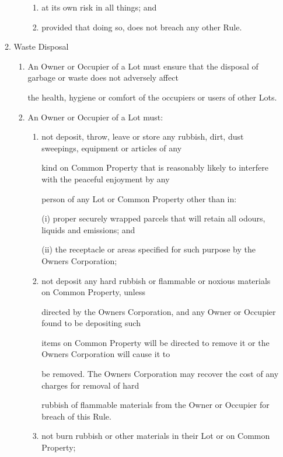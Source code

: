 \documentclass{article}
\begin{document}
\begin{enumerate}[label=\arabic*.]
\begin{enumerate}[label=\arabic{enumi}.\arabic*.]
\begin{enumerate}[label=(\arabic*)]
\begin{enumerate}[label=(\alph*)]
\item  at its own risk in all things; and 

\item  provided that doing so, does not breach any other Rule. 

\end{enumerate}
\end{enumerate}
\item  Waste Disposal 

\begin{enumerate}[label=(\arabic*)]
\item  An Owner or Occupier of a Lot must ensure that the disposal of garbage or waste does not adversely affect 

the health, hygiene or comfort of the occupiers or users of other Lots. 

\item  An Owner or Occupier of a Lot must: 

\begin{enumerate}[label=(\alph*)]
\item  not deposit, throw, leave or store any rubbish, dirt, dust sweepings, equipment or articles of any 

kind on Common Property that is reasonably likely to interfere with the peaceful enjoyment by any 

person of any Lot or Common Property other than in: 

(i) proper securely wrapped parcels that will retain all odours, liquids and emissions; and 

(ii) the receptacle or areas specified for such purpose by the Owners Corporation; 

\item  not deposit any hard rubbish or flammable or noxious materials on Common Property, unless 

directed by the Owners Corporation, and any Owner or Occupier found to be depositing such 

items on Common Property will be directed to remove it or the Owners Corporation will cause it to 

be removed. The Owners Corporation may recover the cost of any charges for removal of hard 

rubbish of flammable materials from the Owner or Occupier for breach of this Rule. 

\item  not burn rubbish or other materials in their Lot or on Common Property; 


\end{enumerate}
\end{enumerate}
\end{enumerate}
\end{enumerate}
\end{document}
